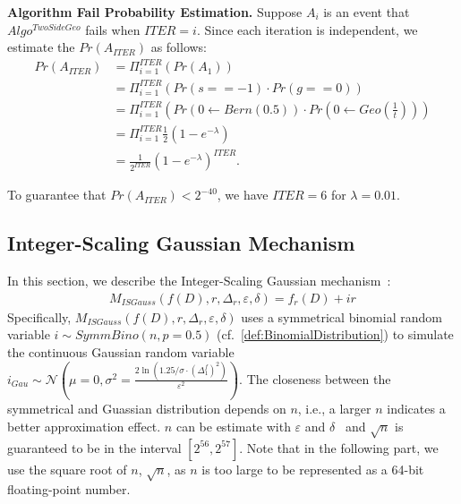 \textbf{Algorithm Fail Probability Estimation. }
Suppose $A_i$ is an event that $Algo^{TwoSideGeo}$ fails when $ITER=i$.
Since each iteration is independent, we estimate the $Pr\left(A_{ITER}\right)$ as follows:
\begin{equation}
    \begin{split}
        Pr\left(A_{ITER}\right) & = \Pi _{i=1}^{ITER}\left(Pr\left(A_1\right) \right) \\
        &= \Pi _{i=1}^{ITER} \left(Pr\left(s==-1\right)\cdot  Pr\left(g==0\right) \right)\\
        &=       \Pi _{i=1}^{ITER} \left(Pr\left(0\gets Bern\left(0.5\right) \right)\cdot Pr\left(0\gets Geo\left(\frac{1}{t}\right) \right)  \right)                   \\
        &= \Pi _{i=1}^{ITER} \frac{1}{2}  \left(1-e^{-\lambda}\right) \\
        &= \frac{1}{2^{ITER}}  \left(1-e^{-\lambda}\right)^{ITER}.
    \end{split}
\end{equation}

To guarantee that $Pr\left(A_{ITER}\right)<2^{-40}$, we have $ITER = 6$ for $\lambda = 0.01$.




\subsection{Integer-Scaling Gaussian Mechanism}
\label{subsec:IntegerScalingGaussianMechanism}
In this section, we describe the Integer-Scaling Gaussian mechanism~\cite{googleDP2019}:
\begin{equation}
    \begin{split}
        M_{ISGauss}\left(f\left(D\right),r,\Delta_r,\varepsilon,\delta\right)=f_r\left(D\right) +ir
    \end{split}
\end{equation}
Specifically, $M_{ISGauss}\left(f\left(D\right),r,\Delta_r,\varepsilon,\delta\right)$ uses a symmetrical binomial random variable $i\sim SymmBino\left(n,p=0.5\right) $ (cf.~\autoref{def:BinomialDistribution}) to simulate the continuous Gaussian random variable $i_{Gau}\sim \mathcal{N} \left(\mu=0,\sigma^2=\frac{2 \ln\left(1.25/\sigma \cdot \left(\Delta_1^f\right)^2 \right) }{\varepsilon^2}\right) $. The closeness between the symmetrical and Guassian distribution depends on $n$, i.e., a larger $n$ indicates a better approximation effect. $n$ can be estimate with $\varepsilon$ and $\delta$~\cite{balle2018improving} and $\sqrt{n} $ is guaranteed to be in the interval $\left[2^{56},2^{57}\right] $. Note that in the following part, we use the square root of $n$, $\sqrt{n}$, as $n$ is too large to be represented as a 64-bit floating-point number.

